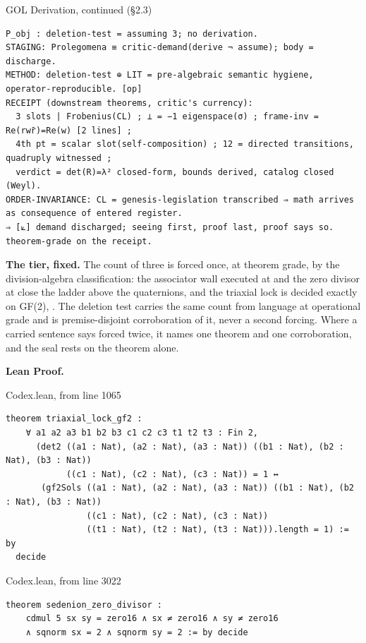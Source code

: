 \documentclass[10pt,twocolumn]{article}
\begin{document}
\begin{golbox}{GOL Derivation, continued (§2.3)}
\begin{lstlisting}[style=golv]
P_obj : deletion-test = assuming 3; no derivation.
STAGING: Prolegomena ≡ critic-demand(derive ¬ assume); body = discharge.
METHOD: deletion-test ⊕ LIT = pre-algebraic semantic hygiene, operator-reproducible. [op]
RECEIPT (downstream theorems, critic's currency):
  3 slots | Frobenius(CL) ; ⊥ = −1 eigenspace(σ) ; frame-inv = Re(rwr̄)=Re(w) [2 lines] ;
  4th pt = scalar slot(self-composition) ; 12 = directed transitions, quadruply witnessed ;
  verdict = det(R)=λ² closed-form, bounds derived, catalog closed (Weyl).
ORDER-INVARIANCE: CL = genesis-legislation transcribed ⇒ math arrives as consequence of entered register.
⇒ [⟀] demand discharged; seeing first, proof last, proof says so. theorem-grade on the receipt.
\end{lstlisting}
\end{golbox}

\textbf{The tier, fixed.} The count of three is forced once, at theorem
grade, by the division-algebra classification: the associator wall
executed at \texttt{} and the zero
divisor at \texttt{} close the
ladder above the quaternions, and the triaxial lock is decided exactly
on GF(2), \texttt{}. The deletion test
carries the same count from language at operational grade and is
premise-disjoint corroboration of it, never a second forcing. Where a
carried sentence says forced twice, it names one theorem and one
corroboration, and the seal rests on the theorem alone.

\textbf{Lean Proof.}

\begin{leanexcerpt}{Codex.lean, from line 1065}
\begin{lstlisting}[style=leanx,firstnumber=1065]
theorem triaxial_lock_gf2 :
    ∀ a1 a2 a3 b1 b2 b3 c1 c2 c3 t1 t2 t3 : Fin 2,
      (det2 ((a1 : Nat), (a2 : Nat), (a3 : Nat)) ((b1 : Nat), (b2 : Nat), (b3 : Nat))
            ((c1 : Nat), (c2 : Nat), (c3 : Nat)) = 1 ↔
       (gf2Sols ((a1 : Nat), (a2 : Nat), (a3 : Nat)) ((b1 : Nat), (b2 : Nat), (b3 : Nat))
                ((c1 : Nat), (c2 : Nat), (c3 : Nat))
                ((t1 : Nat), (t2 : Nat), (t3 : Nat))).length = 1) := by
  decide
\end{lstlisting}
\end{leanexcerpt}

\begin{leanexcerpt}{Codex.lean, from line 3022}
\begin{lstlisting}[style=leanx,firstnumber=3022]
theorem sedenion_zero_divisor :
    cdmul 5 sx sy = zero16 ∧ sx ≠ zero16 ∧ sy ≠ zero16
    ∧ sqnorm sx = 2 ∧ sqnorm sy = 2 := by decide
\end{lstlisting}
\end{leanexcerpt}
\end{document}
